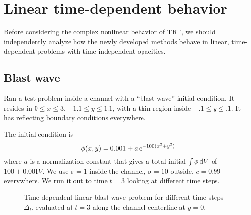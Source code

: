 \section{Linear time-dependent behavior}

Before considering the complex nonlinear behavior of TRT, we should
independently analyze how the newly developed methods behave in linear,
time-dependent problems with time-independent opacities.

\subsection{Blast wave}

Ran a test problem inside a channel with a ``blast wave'' initial condition. It
resides in $0 \le x \le 3$, $-1.1 \le y \le 1.1$, with a thin region inside
$-.1 \le y \le .1$. It has reflecting boundary conditions everywhere.

The initial condition is
\begin{equation*}
  \phi(x,y) = 0.001 + a \mathop{}\!\mathrm{e}^{-100 (x^2 + y^2) }
\end{equation*}
where $a$ is a normalization constant that gives a total initial $\int \phi
\mathop{}\!\mathrm{d} V$ of $100 + 0.001 V$. We use $\sigma=1$ inside the channel, $\sigma=10$
outside, $c=0.99$ everywhere. We run it out to time $t=3$ looking at different
time steps.
\begin{figure}[htb]
  \centering\small
  \subfigure[$\Delta_t=0.02$]{\hspace{-.1in}\hspace{-.1in}}%
  \subfigure[$\Delta_t=0.05$]{\hspace{-.1in}\hspace{-.1in}}
  \subfigure[$\Delta_t=0.10$]{\hspace{-.1in}\hspace{-.1in}}%
  \subfigure[$\Delta_t=0.20$]{\hspace{-.1in}\hspace{-.1in}}
  \subfigure[$\Delta_t=0.50$]{\hspace{-.1in}\hspace{-.1in}}%
  \subfigure[$\Delta_t=1.00$]{\hspace{-.1in}\hspace{-.1in}}
  \caption{Time-dependent linear blast wave problem for different time steps
  $\Delta_t$, evaluated at $t=3$ along the channel centerline at $y=0$.}
  \label{fig:blastAp1Results}
\end{figure}


